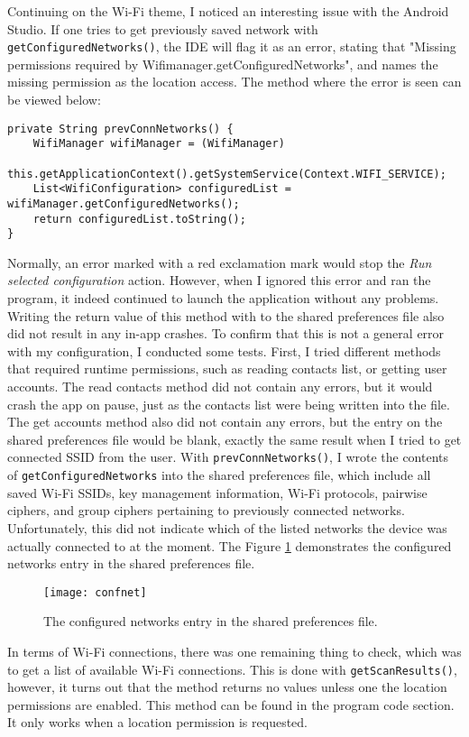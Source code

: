 \documentclass[
  a4paper,  %
  twoside,  %
  bibliography=totoc,
  headsepline,
  cleardoublepage=empty,
  parskip=half,
  draft=false,
  open=any
]{scrbook}
\begin{document}
Continuing on the Wi-Fi theme, I noticed an interesting issue with the Android Studio. If one tries to get previously saved network with \texttt{getConfiguredNetworks()}, the IDE will flag it as an error, stating that "Missing permissions required by Wifimanager.getConfiguredNetworks", and names the missing permission as the location access. The method where the error is seen can be viewed below:
\begin{lstlisting}
private String prevConnNetworks() {
	WifiManager wifiManager = (WifiManager)
	this.getApplicationContext().getSystemService(Context.WIFI_SERVICE);
	List<WifiConfiguration> configuredList = wifiManager.getConfiguredNetworks();
	return configuredList.toString();
}
\end{lstlisting}
Normally, an error marked with a red exclamation mark would stop the \textit{Run selected configuration} action. However, when I ignored this error and ran the program, it indeed continued to launch the application without any problems. Writing the return value of this method with to the shared preferences file also did not result in any in-app crashes. To confirm that this is not a general error with my configuration, I conducted some tests. First, I tried different methods that required runtime permissions, such as reading contacts list, or getting user accounts. The read contacts method did not contain any errors, but it would crash the app on pause, just as the contacts list were being written into the file. The get accounts method also did not contain any errors, but the entry on the shared preferences file would be blank, exactly the same result when I tried to get connected SSID from the user. With \texttt{prevConnNetworks()}, I wrote the contents of \texttt{getConfiguredNetworks} into the shared preferences file, which include all saved Wi-Fi SSIDs, key management information, Wi-Fi protocols, pairwise ciphers, and group ciphers pertaining to previously connected networks. Unfortunately, this did not indicate which of the listed networks the device was actually connected to at the moment. The Figure \ref{confnet} demonstrates the configured networks entry in the shared preferences file.

\begin{figure}\centering
	\texttt{[image: confnet]}
	\caption{The configured networks entry in the shared preferences file.}
	\label{confnet}
\end{figure}

In terms of Wi-Fi connections, there was one remaining thing to check, which was to get a list of available Wi-Fi connections. This is done with \texttt{getScanResults()}, however, it turns out that the method returns no values unless one the location permissions are enabled. This method can be found in the program code section. It only works when a location permission is requested.
\end{document}

